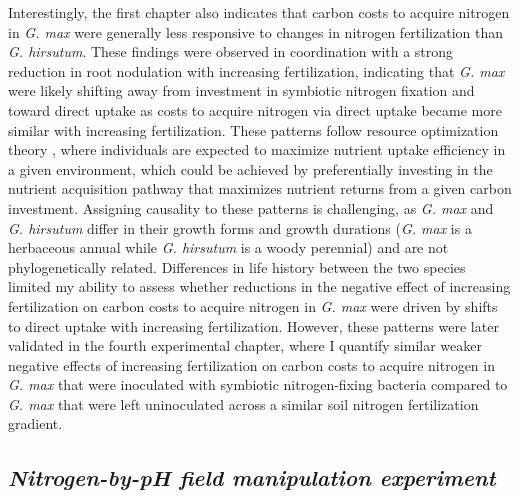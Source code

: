 Interestingly, the first chapter also indicates that carbon costs to acquire nitrogen in \textit{G. max} were generally less responsive to changes in nitrogen fertilization than \textit{G. hirsutum}. These findings were observed in coordination with a strong reduction in root nodulation with increasing fertilization, indicating that \textit{G. max} were likely shifting away from investment in symbiotic nitrogen fixation and toward direct uptake as costs to acquire nitrogen via direct uptake became more similar with increasing fertilization. These patterns follow resource optimization theory , where individuals are expected to maximize nutrient uptake efficiency in a given environment, which could be achieved by preferentially investing in the nutrient acquisition pathway that maximizes nutrient returns from a given carbon investment. Assigning causality to these patterns is challenging, as \textit{G. max} and \textit{G. hirsutum} differ in their growth forms and growth durations (\textit{G. max} is a herbaceous annual while \textit{G. hirsutum} is a woody perennial) and are not phylogenetically related. Differences in life history between the two species limited my ability to assess whether reductions in the negative effect of increasing fertilization on carbon costs to acquire nitrogen in \textit{G. max} were driven by shifts to direct uptake with increasing fertilization. However, these patterns were later validated in the fourth experimental chapter, where I quantify similar weaker negative effects of increasing fertilization on carbon costs to acquire nitrogen in \textit{G. max} that were inoculated with symbiotic nitrogen-fixing bacteria compared to \textit{G. max} that were left uninoculated across a similar soil nitrogen fertilization gradient.

\subsection{\textit{Nitrogen-by-pH field manipulation experiment}}
